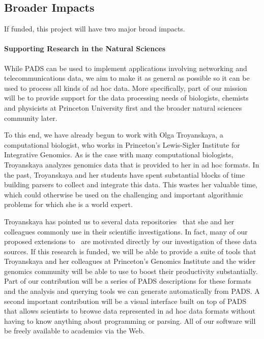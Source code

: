 \documentclass[11pt]{article}
\begin{document}
\subsection{Broader Impacts}
\label{ssec:impact}

If funded, this project will have two major broad impacts.

\paragraph*{Supporting Research in the Natural Sciences}
While PADS can be used to implement applications involving
networking and telecommunications data,  we aim to make it
as general as possible so it can be used to process all
kinds of ad hoc data.  More specifically, part of our mission will be
to provide support for the data processing needs of biologists,
chemists and physicists at Princeton University first and 
the broader natural sciences community later.  
 
To this end, we have already begun to work with Olga Troyanskaya, a
computational biologist, who works in Princeton's Lewis-Sigler Institute 
for Integrative Genomics.  
As is the case with many computational biologists,
Troyanskaya analyzes genomics data that is provided to her in ad hoc
formats.  In the past, Troyanskaya and her students have spent
substantial blocks of time building parsers to collect and integrate
this data.  This wastes her valuable time, which could otherwise be
used on the challenging and important algorithmic problems for which
she is a world expert.

Troyanskaya has pointed us to several data
repositories~\cite{grid,bind,geneontology} that she and her colleagues
commonly use in their scientific investigations.  
In fact, many of our proposed extensions to \pads{}\ are motivated directly by
our investigation of these data sources.
If this research is
funded, we will be able to provide a suite of tools that Troyanskaya
and her colleagues at Princeton's Genomics Institute and the wider
genomics community will be able to use to boost their productivity
substantially.  Part of our contribution will be a series of PADS
descriptions for these formats and the analysis and querying tools we
can generate automatically from PADS.  A second important contribution
will be a visual interface built on top of PADS that allows scientists
to browse data represented in ad hoc data formats without having to
know anything about programming or parsing.  All of our software will
be freely available to academics via the Web.
\end{document}
